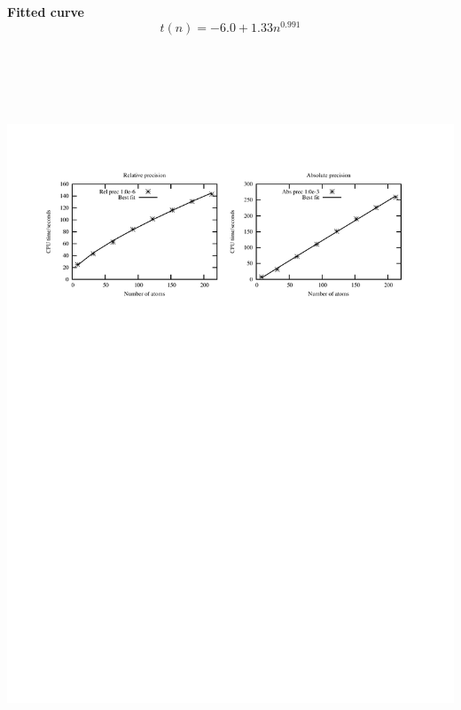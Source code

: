 \begin{frame}
\begin{columns}
\begin{column}{.50\textwidth}
\begin{figure}
	\end{figure}
	\textbf{Fitted curve}
	\begin{equation}
	    \nonumber
	    t(n) = -6.0 + 1.33n^{0.991}
	\end{equation}
	\ \\
	\ \\
    \end{column}
    \end{columns}    
    \ \\
    \begin{center}
	\includegraphics[scale=0.6, clip, viewport = 50 550 540 730]{figures/linearScaling.pdf}
    \end{center}

    \vspace{10mm}

\end{frame}


